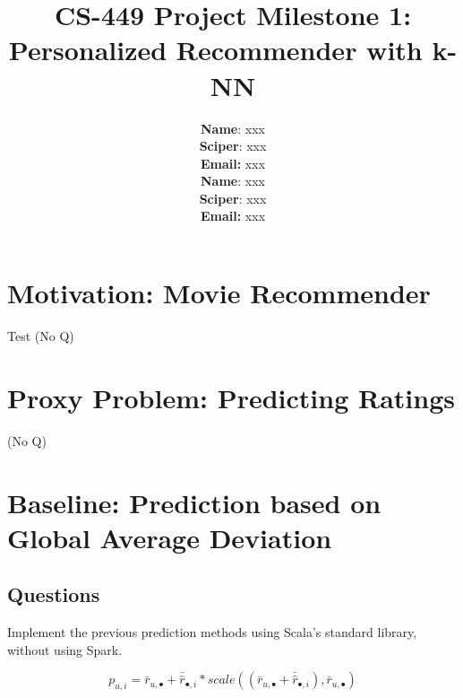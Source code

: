 \documentclass{article}
\title{CS-449 Project Milestone 1: Personalized Recommender with k-NN}
\author{
\textbf{Name}: xxx\\
\textbf{Sciper}: xxx\\
\textbf{Email:} xxx\\
\textbf{Name}: xxx\\
\textbf{Sciper}: xxx\\
\textbf{Email:} xxx\\
}
\begin{document}
\maketitle

\section{Motivation: Movie Recommender}

Test
(No Q)
\section{Proxy Problem: Predicting Ratings}
(No Q)

\section{Baseline: Prediction based on Global Average Deviation}
\subsection{Questions}
\label{section:q1}

Implement the previous prediction methods using Scala's standard library, without using Spark.

\begin{equation}
    \label{eq:baseline}
    p_{u,i} = \bar r_{u,\bullet} + \bar{\hat r}_{\bullet,i} * scale( (\bar r_{u,\bullet} + \bar{\hat r}_{\bullet,i}), \bar r_{u,\bullet})
\end{equation}
  
\end{document}
